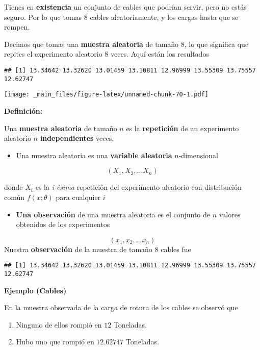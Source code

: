 \documentclass[
]{book}
\providecommand{\tightlist}{%
  \setlength{\itemsep}{0pt}\setlength{\parskip}{0pt}}
\begin{document}
Tienes en \textbf{existencia} un conjunto de cables que podrían servir, pero no estás seguro. Por lo que tomas \(8\) cables aleatoriamente, y los cargas hasta que se rompen.

Decimos que tomas una \textbf{muestra aleatoria} de tamaño \(8\), lo que significa que repites el experimento aleatorio \(8\) veces. Aquí están los resultados

\begin{verbatim}
## [1] 13.34642 13.32620 13.01459 13.10811 12.96999 13.55309 13.75557 12.62747
\end{verbatim}

\texttt{[image: \_main\_files/figure-latex/unnamed-chunk-70-1.pdf]}

\textbf{Definición:}

Una \textbf{muestra aleatoria} de tamaño \(n\) es la \textbf{repetición} de un experimento aleatorio \(n\) \textbf{independientes} veces.

\begin{itemize}
\tightlist
\item
  Una muestra aleatoria es una \textbf{variable aleatoria} \(n\)-dimensional
\end{itemize}

\[(X_1, X_2, ... X_n)\]

donde \(X_i\) es la \emph{i-ésima} repetición del experimento aleatorio con distribución común \(f(x; \theta)\) para cualquier \(i\)

\begin{itemize}
\tightlist
\item
  \textbf{Una observación} de una muestra aleatoria es el conjunto de \(n\) valores obtenidos de los experimentos
\end{itemize}

\[(x_1, x_2, ... x_n)\]
Nuestra \textbf{observación} de la muestra de tamaño \(8\) cables fue

\begin{verbatim}
## [1] 13.34642 13.32620 13.01459 13.10811 12.96999 13.55309 13.75557 12.62747
\end{verbatim}

\textbf{Ejemplo (Cables)}

En la muestra observada de la carga de rotura de los cables se observó que

\begin{enumerate}
\def\labelenumi{\arabic{enumi})}
\item
  Ninguno de ellos rompió en \(12\) Toneladas.
\item
  Hubo uno que rompió en \(12.62747\) Toneladas.
\end{enumerate}
\end{document}
